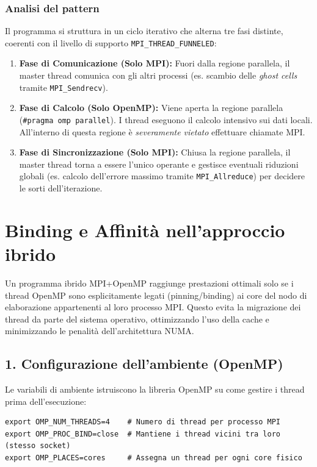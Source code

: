 \subsubsection*{Analisi del pattern}
Il programma si struttura in un ciclo iterativo che alterna tre fasi distinte, coerenti con il livello di supporto \texttt{MPI\_THREAD\_FUNNELED}:
\begin{enumerate}
    \item \textbf{Fase di Comunicazione (Solo MPI):} Fuori dalla regione parallela, il master thread comunica con gli altri processi (es. scambio delle \textit{ghost cells} tramite \texttt{MPI\_Sendrecv}).
    \item \textbf{Fase di Calcolo (Solo OpenMP):} Viene aperta la regione parallela (\texttt{\#pragma omp parallel}). I thread eseguono il calcolo intensivo sui dati locali. All'interno di questa regione è \textit{severamente vietato} effettuare chiamate MPI.
    \item \textbf{Fase di Sincronizzazione (Solo MPI):} Chiusa la regione parallela, il master thread torna a essere l'unico operante e gestisce eventuali riduzioni globali (es. calcolo dell'errore massimo tramite \texttt{MPI\_Allreduce}) per decidere le sorti dell'iterazione.
\end{enumerate}
\section{Binding e Affinità nell'approccio ibrido}
Un programma ibrido MPI+OpenMP raggiunge prestazioni ottimali solo se i thread OpenMP sono esplicitamente legati (pinning/binding) ai core del nodo di elaborazione appartenenti al loro processo MPI. Questo evita la migrazione dei thread da parte del sistema operativo, ottimizzando l'uso della cache e minimizzando le penalità dell'architettura NUMA.

\subsection*{1. Configurazione dell'ambiente (OpenMP)}
Le variabili di ambiente istruiscono la libreria OpenMP su come gestire i thread prima dell'esecuzione:
\begin{verbatim}
export OMP_NUM_THREADS=4    # Numero di thread per processo MPI
export OMP_PROC_BIND=close  # Mantiene i thread vicini tra loro (stesso socket)
export OMP_PLACES=cores     # Assegna un thread per ogni core fisico
\end{verbatim}

